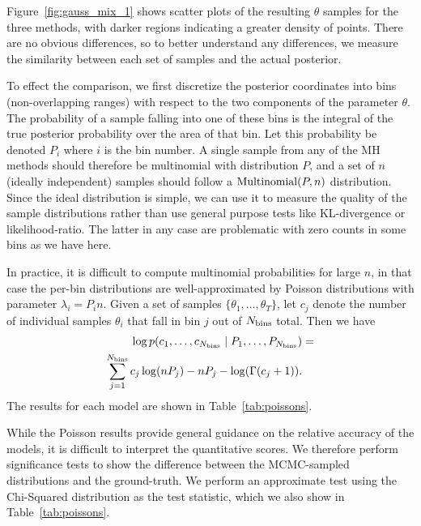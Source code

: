\documentclass[twoside]{article} \usepackage{aistats2017}
\begin{document}
Figure~\ref{fig:gauss_mix_1} shows scatter plots of the resulting $\theta$
samples for the three methods, with darker regions indicating a greater density
of points. There are no obvious differences, so to better understand any
differences, we measure the similarity between each set of samples and the
actual posterior. 

To effect the comparison, we first discretize the posterior coordinates into
bins (non-overlapping ranges) with respect to the two components of the
parameter $\theta$.  The probability of a sample falling into one of these bins
is the integral of the true posterior probability over the area of that bin. Let
this probability be denoted $P_i$ where $i$ is the bin number. A single sample
from any of the MH methods should therefore be multinomial with distribution
$P$, and a set of $n$ (ideally independent) samples should follow a ${\rm
Multinomial}(P,n)$ distribution.  Since the ideal distribution is simple, we can
use it to measure the quality of the sample distributions rather than use
general purpose tests like KL-divergence or likelihood-ratio.  The latter in any
case are problematic with zero counts in some bins as we have here.

In practice, it is difficult to compute multinomial probabilities for large $n$,
in that case the per-bin distributions are well-approximated by Poisson
distributions with parameter $\lambda_i=P_i n$. Given a set of samples
$\{\theta_1,\ldots,\theta_T\}$, let $c_j$ denote the number of individual samples
$\theta_i$ that fall in bin $j$ out of $N_{\rm bins}$ total. Then we have
\begin{equation}\label{eq:log_prob_poissons}
\begin{split}
    \log p(c_1, \ldots, c_{N_{\rm bins}} \mid P_1, \ldots, P_{N_{\rm bins}}) & =  \\
    \sum_{j=1}^{N_{\rm bins}} c_j \log (n P_j) - n P_j - \log(\Gamma(c_j+1)). & \\
\end{split}
\end{equation}
The results for each model are shown in Table~\ref{tab:poissons}.

While the Poisson results provide general guidance on the relative accuracy of
the models, it is difficult to interpret the quantitative scores. We therefore
perform significance tests to show the difference between the MCMC-sampled
distributions and the ground-truth.  We perform an approximate test using
the Chi-Squared distribution as the test statistic, which we also show in
Table~\ref{tab:poissons}.
\end{document}
